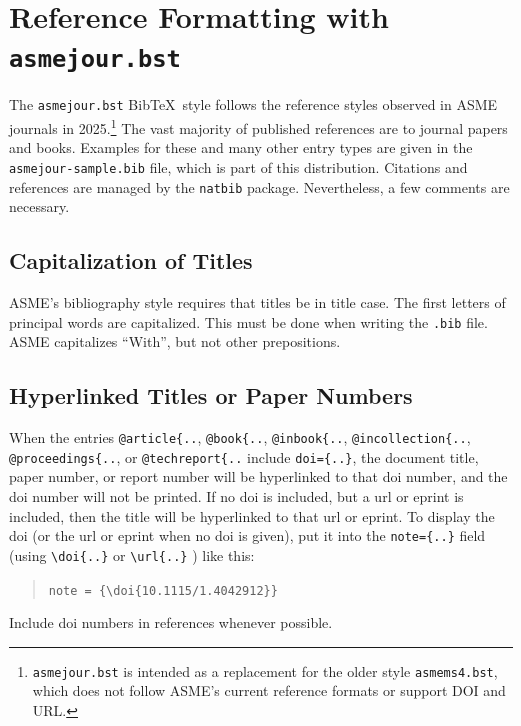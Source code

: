 \documentclass[balance,nocopyright,upint,varvw,hyphenate,barcolor=Goldenrod3,german]{asmejour}%
\newcommand*\BibTeX{Bib\TeX}
\begin{document}


\section{Reference Formatting with \texttt{asmejour.bst}}

The {\upshape\texttt{asmejour.bst}} \BibTeX\ style follows the reference styles observed in ASME journals in 2025.\footnote{\texttt{asmejour.bst} is intended as a replacement for the older style \texttt{asmems4.bst}, which does not follow ASME's current reference formats or support DOI and URL.} The vast majority of published references are to journal papers and books. Examples for these and many other entry types are given in the \texttt{asmejour-sample.bib} file, which is part of this distribution. Citations and references are managed by the \texttt{natbib} package.
Nevertheless, a few comments are necessary. 

\subsection{Capitalization of Titles} ASME's bibliography style requires that titles be in title case. The first letters of principal words are capitalized. This must be done when writing the \texttt{.bib} file.
ASME capitalizes ``With'', but not other prepositions.

\subsection{Hyperlinked Titles or Paper Numbers} When the entries \verb|@article{..|, \verb|@book{..|, \verb|@inbook{..|, \verb|@incollection{..|, \verb|@proceedings{..|, or \verb|@techreport{..| include \verb|doi={..}|, the document title, paper number, or report number will be hyperlinked to that doi number, and the doi number will not be printed. If no doi is included, but a url or eprint is included, then the title will be hyperlinked to that url or eprint. To display the doi (or the url or eprint when no doi is given), put it into the \verb|note={..}| field (using \verb|\doi{..}| or \verb|\url{..}| ) like this:
\begin{quote}
\verb|note = {\doi{10.1115/1.4042912}}|
\end{quote}
Include doi numbers in references whenever possible.
\end{document}
